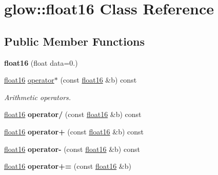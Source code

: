 \hypertarget{classglow_1_1float16}{}\section{glow\+:\+:float16 Class Reference}
\label{classglow_1_1float16}
\subsection*{Public Member Functions}
\begin{DoxyCompactItemize}
\item 
\mbox{\label{classglow_1_1float16_adb2ca210d5e8950b5213f35d3f66b328}} 
{\bfseries float16} (float data=0.)
\item 
\mbox{\label{classglow_1_1float16_ac2651b8e71b2ed66f22a266f739754a0}} 
\hyperlink{classglow_1_1float16}{float16} \hyperlink{classglow_1_1float16_ac2651b8e71b2ed66f22a266f739754a0}{operator$\ast$} (const \hyperlink{classglow_1_1float16}{float16} \&b) const
\begin{DoxyCompactList}\small\item\em Arithmetic operators. \end{DoxyCompactList}\item 
\mbox{\label{classglow_1_1float16_ae0d4c914a6ba9ab66d189fb3896a4bb1}} 
\hyperlink{classglow_1_1float16}{float16} {\bfseries operator/} (const \hyperlink{classglow_1_1float16}{float16} \&b) const
\item 
\mbox{\label{classglow_1_1float16_a0ad48d41ff80d032cb50b8a9953569d7}} 
\hyperlink{classglow_1_1float16}{float16} {\bfseries operator+} (const \hyperlink{classglow_1_1float16}{float16} \&b) const
\item 
\mbox{\label{classglow_1_1float16_add7d88d87d08ebd5ac0f75169d9d036c}} 
\hyperlink{classglow_1_1float16}{float16} {\bfseries operator-\/} (const \hyperlink{classglow_1_1float16}{float16} \&b) const
\item 
\mbox{\label{classglow_1_1float16_a80fa33647f07115c880eb76ac7f8313b}} 
\hyperlink{classglow_1_1float16}{float16} {\bfseries operator+=} (const \hyperlink{classglow_1_1float16}{float16} \&b)

\end{DoxyCompactItemize}
